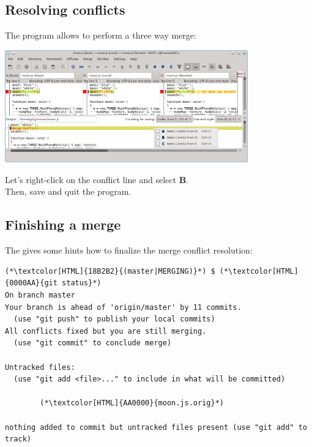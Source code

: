 \subsection{Resolving conflicts}
\begin{frame}[fragile]
  \subslidetitle
  The program  allows to perform a three way merge:
  \\
  \vspace{1em}
  \centerline{\includegraphics[width=10.5cm]{../screen/kdiff3.png}}

  \vspace{1em}
  Let's right-click on the conflict line and select \textbf{B}.
  \\Then, save and quit the program.
\end{frame}

\subsection{Finishing a merge}
\begin{frame}[fragile]
  \subslidetitle
  The  gives some hints how to finalize the merge conflict resolution:
  \begin{lstlisting}
(*\textcolor[HTML]{18B2B2}{(master|MERGING)}*) $ (*\textcolor[HTML]{0000AA}{git status}*)
On branch master
Your branch is ahead of 'origin/master' by 11 commits.
  (use "git push" to publish your local commits)
All conflicts fixed but you are still merging.
  (use "git commit" to conclude merge)

Untracked files:
  (use "git add <file>..." to include in what will be committed)

        (*\textcolor[HTML]{AA0000}{moon.js.orig}*)

nothing added to commit but untracked files present (use "git add" to track)
\end{lstlisting}
\end{frame}

